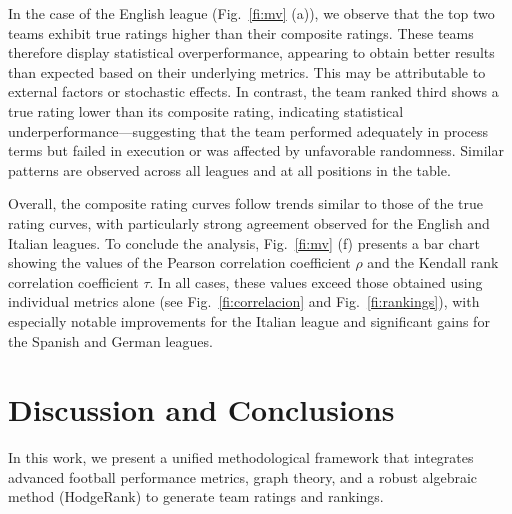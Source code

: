 \documentclass[preprint, amsmath,amssymb, pre]{revtex4-2}
\begin{document}
In the case of the English league (Fig.~\ref{fi:mv} (a)), we observe that the top two teams exhibit true ratings higher than their composite ratings. These teams therefore display statistical overperformance, appearing to obtain better results than expected based on their underlying metrics. This may be attributable to external factors or stochastic effects. In contrast, the team ranked third shows a true rating lower than its composite rating, indicating statistical underperformance—suggesting that the team performed adequately in process terms but failed in execution or was affected by unfavorable randomness. Similar patterns are observed across all leagues and at all positions in the table.

Overall, the composite rating curves follow trends similar to those of the true rating curves, with particularly strong agreement observed for the English and Italian leagues. To conclude the analysis, Fig.~\ref{fi:mv} (f) presents a bar chart showing the values of the Pearson correlation coefficient $\rho$ and the Kendall rank correlation coefficient $\tau$. In all cases, these values exceed those obtained using individual metrics alone (see Fig.~\ref{fi:correlacion} and Fig.~\ref{fi:rankings}), with especially notable improvements for the Italian league and significant gains for the Spanish and German leagues.

\section{Discussion and Conclusions}
\label{se:concl}

In this work, we present a unified methodological framework that integrates advanced football performance metrics, graph theory, and a robust algebraic method (HodgeRank) to generate team ratings and rankings.
\end{document}
